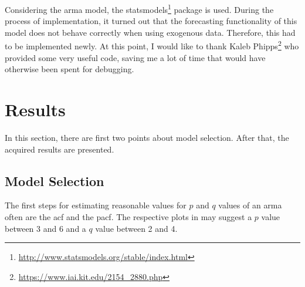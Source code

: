 Considering the \gls{arma} model, the statsmodels\footnote{\url{http://www.statsmodels.org/stable/index.html}} package is used. During the process of implementation, it turned out that the forecasting functionality of this model does not behave correctly when using exogenous data. Therefore, this had to be implemented newly. At this point, I would like to thank Kaleb Phipps\footnote{\url{https://www.iai.kit.edu/2154_2880.php}} who provided some very useful code, saving me a lot of time that would have otherwise been spent for debugging.\\


\section{Results}
\label{sec:results}

In this section, there are first two points about model selection. After that, the acquired results are presented.\\


\subsection*{Model Selection}

The first steps for estimating reasonable values for $p$ and $q$ values of an \gls{arma} often are the \gls{acf} and the \gls{pacf}. The respective plots in  may suggest a $p$ value between 3 and 6 and a $q$ value between 2 and 4.\\

